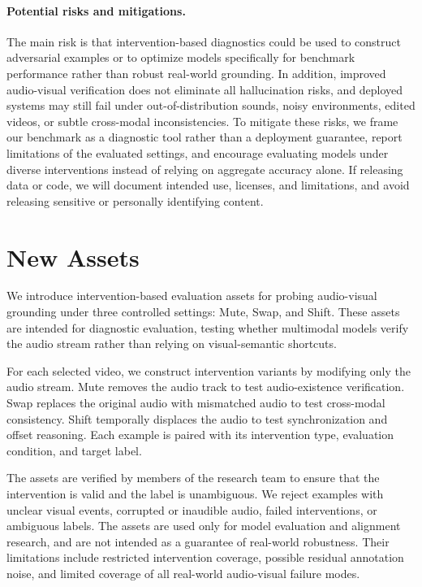 \documentclass{llmxive}
\begin{document}
\paragraph{Potential risks and mitigations.}
The main risk is that intervention-based diagnostics could be used to construct adversarial examples or to optimize models specifically for benchmark performance rather than robust real-world grounding. In addition, improved audio-visual verification does not eliminate all hallucination risks, and deployed systems may still fail under out-of-distribution sounds, noisy environments, edited videos, or subtle cross-modal inconsistencies. To mitigate these risks, we frame our benchmark as a diagnostic tool rather than a deployment guarantee, report limitations of the evaluated settings, and encourage evaluating models under diverse interventions instead of relying on aggregate accuracy alone. If releasing data or code, we will document intended use, licenses, and limitations, and avoid releasing sensitive or personally identifying content.

\section{New Assets}
\label{app:assets}

We introduce intervention-based evaluation assets for probing audio-visual grounding under three controlled settings: Mute, Swap, and Shift. These assets are intended for diagnostic evaluation, testing whether multimodal models verify the audio stream rather than relying on visual-semantic shortcuts.

For each selected video, we construct intervention variants by modifying only the audio stream. Mute removes the audio track to test audio-existence verification. Swap replaces the original audio with mismatched audio to test cross-modal consistency. Shift temporally displaces the audio to test synchronization and offset reasoning. Each example is paired with its intervention type, evaluation condition, and target label.

The assets are verified by members of the research team to ensure that the intervention is valid and the label is unambiguous. We reject examples with unclear visual events, corrupted or inaudible audio, failed interventions, or ambiguous labels. The assets are used only for model evaluation and alignment research, and are not intended as a guarantee of real-world robustness. Their limitations include restricted intervention coverage, possible residual annotation noise, and limited coverage of all real-world audio-visual failure modes.



\end{document}
